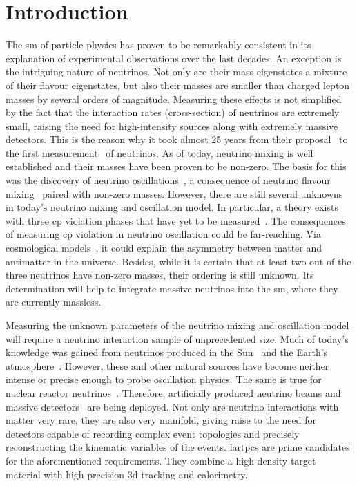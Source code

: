 \chapter{Introduction}
\label{chap:introduction}

The \gls{sm} of particle physics has proven to be remarkably consistent in its explanation of experimental observations over the last decades.
An exception is the intriguing nature of neutrinos.
Not only are their mass eigenstates a mixture of their flavour eigenstates, but also their masses are smaller than charged lepton masses by several orders of magnitude.
Measuring these effects is not simplified by the fact that the interaction rates (cross-section) of neutrinos are extremely small, raising the need for high-intensity sources along with extremely massive detectors.
This is the reason why it took almost \num{25} years from their proposal~\cite{pauliLetter} to the first measurement~\cite{reinesCowan} of neutrinos.
As of today, neutrino mixing is well established and their masses have been proven to be non-zero.
The basis for this was the discovery of neutrino oscillations~\cite{superKAtmos1, superKAtmos2, snoSolar}, a consequence of neutrino flavour mixing~\cite{pontecorvo, makiNakagawaSakata} paired with non-zero masses.
However, there are still several unknowns in today's neutrino mixing and oscillation model.
In particular, a theory exists with three \gls{cp} violation phases that have yet to be measured~\cite{pontecorvo, makiNakagawaSakata, mariuana}.
The consequences of measuring \gls{cp} violation in neutrino oscillation could be far-reaching.
Via cosmological models~\cite{pdg}, it could explain the asymmetry between matter and antimatter in the universe.
Besides, while it is certain that at least two out of the three neutrinos have non-zero masses, their ordering is still unknown.
Its determination will help to integrate massive neutrinos into the \gls{sm}, where they are currently massless.

Measuring the unknown parameters of the neutrino mixing and oscillation model will require a neutrino interaction sample of unprecedented size.
Much of today's knowledge was gained from neutrinos produced in the Sun~\cite{homestake68, homestake98, snoSolar} and the Earth's atmosphere~\cite{superKAtmos1, superKAtmos2}.
However, these and other natural sources have become neither intense or precise enough to probe oscillation physics.
The same is true for nuclear reactor neutrinos~\cite{reinesCowan, dayabayRecent}.
Therefore, artificially produced neutrino beams and massive detectors~\cite{t2kOsc} are being deployed.
Not only are neutrino interactions with matter very rare, they are also very manifold, giving raise to the need for detectors capable of recording complex event topologies and precisely reconstructing the kinematic variables of the events.
\glspl{lartpc} are prime candidates for the aforementioned requirements.
They combine a high-density target material with high-precision \gls{3d} tracking and calorimetry.

